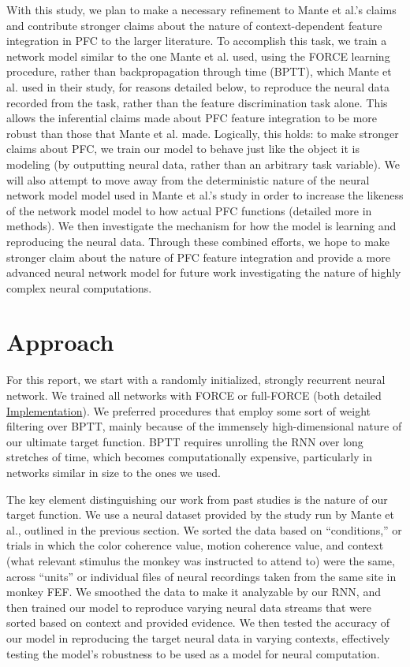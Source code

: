 \documentclass[12pt,a4paper,final]{iopart}
\begin{document}
With this study, we plan to make a necessary refinement to Mante et al.'s claims and contribute stronger claims about the nature of context-dependent feature integration in PFC to the larger literature. To accomplish this task, we train a network model similar to the one Mante et al. used, using the FORCE learning procedure, rather than backpropagation through time (BPTT), which Mante et al. used in their study, for reasons detailed below, to reproduce the neural data recorded from the task, rather than the feature discrimination task alone. This allows the inferential claims made about PFC feature integration to be more robust than those that Mante et al. made. Logically, this holds: to make stronger claims about PFC, we train our model to behave just like the object it is modeling (by outputting neural data, rather than an arbitrary task variable). We will also attempt to move away from the deterministic nature of the neural network model model used in Mante et al.’s study in order to increase the likeness of the network model model to how actual PFC functions (detailed more in methods). We then investigate the mechanism for how the model is learning and reproducing the neural data. Through these combined efforts, we hope to make stronger claim about the nature of PFC feature integration and provide a more advanced neural network model for future work investigating the nature of highly complex neural computations.

\section{Approach}
\label{sec:app}
For this report, we start with a randomly initialized, strongly recurrent neural network. We trained all networks with FORCE or full-FORCE (both detailed \hyperref[sec:imp]{Implementation}). We preferred procedures that employ some sort of weight filtering over BPTT, mainly because of the immensely high-dimensional nature of our ultimate target function. BPTT requires unrolling the RNN over long stretches of time, which becomes computationally expensive, particularly in networks similar in size to the ones we used. 

The key element distinguishing our work from past studies is the nature of our target function. We use a neural dataset provided by the study run by Mante et al., outlined in the previous section. We sorted the data based on ``conditions,'' or trials in which the color coherence value, motion coherence value, and context (what relevant stimulus the monkey was instructed to attend to) were the same, across ``units'' or individual files of neural recordings taken from the same site in monkey FEF. We smoothed the data to make it analyzable by our RNN, and then trained our model to reproduce varying neural data streams that were sorted based on context and provided evidence. We then tested the accuracy of our model in reproducing the target neural data in varying contexts, effectively testing the model's robustness to be used as a model for neural computation.
\end{document}
